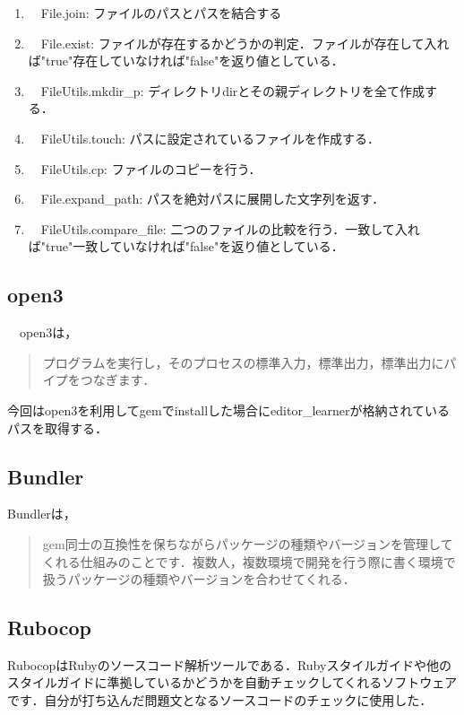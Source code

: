 \begin{enumerate}
\def\labelenumi{\arabic{enumi}.}
\tightlist
\item
　File.join: ファイルのパスとパスを結合する
\item
　File.exist: ファイルが存在するかどうかの判定．ファイルが存在して入れば"true"存在していなければ"false"を返り値としている．
\item
　FileUtils.mkdir\_p: ディレクトリdirとその親ディレクトリを全て作成する．
\item
　FileUtils.touch: パスに設定されているファイルを作成する．
\item
　FileUtils.cp: ファイルのコピーを行う．
\item
　File.expand\_path: パスを絶対パスに展開した文字列を返す．
\item
　FileUtils.compare\_file: 二つのファイルの比較を行う．一致して入れば"true"一致していなければ"false"を返り値としている．

\end{enumerate}

    \subsection{open3}\label{open3}

　open3は，
\begin{quotation}
プログラムを実行し，そのプロセスの標準入力，標準出力，標準出力にパイプをつなぎます． \cite{open3}
\end{quotation}

今回はopen3を利用してgemでinstallした場合にeditor\_learnerが格納されているパスを取得する．

    \subsection{Bundler}\label{bundler}

Bundlerは，
\begin{quotation}
gem同士の互換性を保ちながらパッケージの種類やバージョンを管理してくれる仕組みのことです．複数人，複数環境で開発を行う際に書く環境で扱うパッケージの種類やバージョンを合わせてくれる． \cite{bundler}
\end{quotation}


    \subsection{Rubocop}\label{rubocop}

RubocopはRubyのソースコード解析ツールである．Rubyスタイルガイドや他のスタイルガイドに準拠しているかどうかを自動チェックしてくれるソフトウェアです．自分が打ち込んだ問題文となるソースコードのチェックに使用した．
